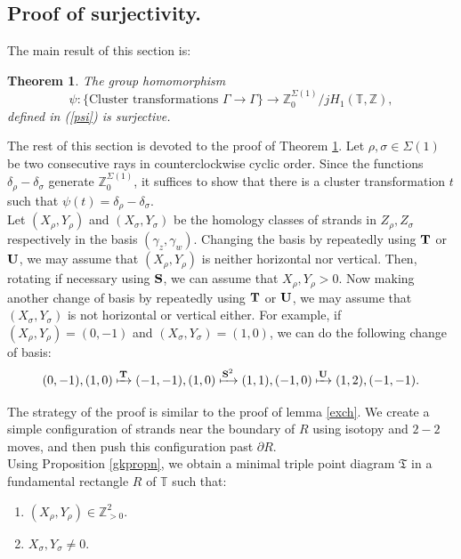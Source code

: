 \documentclass[11pt]{article} %
\newtheorem{theorem}{Theorem}[section]
\theoremstyle{definition}
\newcommand{\Z}{{\mathbb Z}}
\newcommand{\T}{{\mathbb T}}
\newcommand{\ra}{\rightarrow}
\newcommand{\la}{\label}
\begin{document}
\subsection{Proof of surjectivity.} \la{sec:surj}
The main result of this section is:
\begin{theorem}\label{surj}
The group homomorphism 
$$
\psi:\{\text{Cluster transformations } \Gamma \ra \Gamma\} \ra \mathbb Z^{\Sigma(1)}_0/j H_1(\T,\Z),
$$
defined in (\ref{psi}) is surjective.
\end{theorem}

The rest of this section is devoted to the proof of Theorem \ref{surj}. Let $\rho, \sigma \in \Sigma(1)$ be two consecutive rays in counterclockwise cyclic order. Since the functions $\delta_{\rho}-\delta_{\sigma}$ generate $\Z^{\Sigma(1)}_0$, it suffices to show that there is a cluster transformation $t$ such that $\psi(t)=\delta_{\rho}-\delta_{\sigma}$.\\

  Let $(X_\rho,Y_\rho)$ and $(X_\sigma,Y_\sigma)$ be the homology classes of strands in $Z_\rho, Z_\sigma$ respectively in the basis $(\gamma_z,\gamma_w)$. Changing the basis by repeatedly using ${\bf T}$ or ${\bf U}$, we may assume that $(X_\rho,Y_\rho)$ is neither horizontal nor vertical. Then, rotating if necessary using ${\bf S}$, we can assume that $X_\rho,Y_\rho>0$. Now making another change of basis by repeatedly using ${\bf T}$ or ${\bf U}$, we may assume that $(X_\sigma,Y_\sigma)$ is not horizontal or vertical either. For example, if $(X_\rho,Y_\rho)=(0,-1)$ and $(X_\sigma,Y_\sigma)=(1,0)$, we can do the following change of basis:
 $$
 (0,-1), (1,0) \xmapsto[]{{\bf T}} (-1,-1),(1,0)  \xmapsto[]{{\bf S}^2}(1,1),(-1,0) \xmapsto[]{{\bf U}}(1,2),(-1,-1).
 $$
 
The strategy of the proof is similar to the proof of lemma \ref{exch}. We create a simple configuration of strands near the boundary of $R$ using isotopy and $2-2$ moves, and then push this configuration past $\partial R$.\\


Using Proposition \ref{gkpropn}, we obtain a minimal triple point diagram $\mathfrak T$ in a fundamental rectangle $R$ of $\T$ such that:
\begin{enumerate}
    \item $(X_\rho,Y_\rho) \in \Z_{>0}^2$.
    \item $X_\sigma,Y_\sigma \neq 0$.
\end{enumerate}
\end{document}
